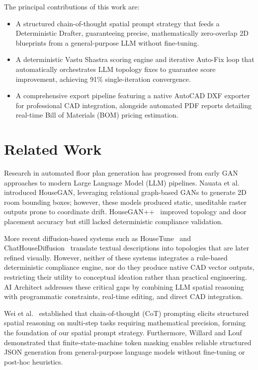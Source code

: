 \documentclass[10pt, twocolumn, letterpaper]{article}
\begin{document}
The principal contributions of this work are:
\begin{itemize}[leftmargin=*, itemsep=0pt, topsep=2pt]
  \item A structured chain-of-thought spatial prompt strategy that feeds a Deterministic Drafter, guaranteeing precise, mathematically zero-overlap 2D blueprints from a general-purpose LLM without fine-tuning.
  \item A deterministic Vastu Shastra scoring engine and iterative Auto-Fix loop that automatically orchestrates LLM topology fixes to guarantee score improvement, achieving 91\% single-iteration convergence.
  \item A comprehensive export pipeline featuring a native AutoCAD DXF exporter for professional CAD integration, alongside automated PDF reports detailing real-time Bill of Materials (BOM) pricing estimation.
\end{itemize}

\section{Related Work}

Research in automated floor plan generation has progressed from early GAN approaches to modern Large Language Model (LLM) pipelines. Nauata et al.~\cite{houseGAN} introduced HouseGAN, leveraging relational graph-based GANs to generate 2D room bounding boxes; however, these models produced static, uneditable raster outputs prone to coordinate drift. HouseGAN++~\cite{houseGANpp} improved topology and door placement accuracy but still lacked deterministic compliance validation.

More recent diffusion-based systems such as HouseTune~\cite{housetune} and ChatHouseDiffusion~\cite{chathousediffusion} translate textual descriptions into topologies that are later refined visually. However, neither of these systems integrates a rule-based deterministic compliance engine, nor do they produce native CAD vector outputs, restricting their utility to conceptual ideation rather than practical engineering. AI Architect addresses these critical gaps by combining LLM spatial reasoning with programmatic constraints, real-time editing, and direct CAD integration.

Wei et al.~\cite{cot_prompting} established that chain-of-thought (CoT)
prompting elicits structured spatial reasoning on multi-step tasks requiring
mathematical precision, forming the foundation of our spatial prompt strategy.
Furthermore, Willard and Louf~\cite{efficient_guided_gen} demonstrated that
finite-state-machine token masking enables reliable structured JSON generation
from general-purpose language models without fine-tuning or post-hoc heuristics.
\end{document}

